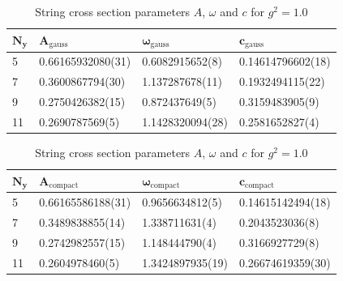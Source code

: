 \begin{table}[!hb]
\centering
\begin{tabular}{llll}
    $\mathbf{N_y}$ & $\mathbf{A_\mathrm{gauss}}$ & $\mathbf{\omega_\mathrm{gauss}}$ & $\mathbf{c_\mathrm{gauss}}$ \\ \hline
   5 & 0.66165932080(31) & 0.6082915652(8) & 0.14614796602(18) \\
   7 & 0.3600867794(30) & 1.137287678(11) & 0.1932494115(22) \\
   9 & 0.2750426382(15) & 0.872437649(5) & 0.3159483905(9) \\
   11 & 0.2690787569(5) & 1.1428320094(28) & 0.2581652827(4) \\
\end{tabular}
\begin{tabular}{llll}
    $\mathbf{N_y}$ & $\mathbf{A_\mathrm{compact}}$ & $\mathbf{\omega_\mathrm{compact}}$ & $\mathbf{c_\mathrm{compact}}$ \\ \hline
   5 & 0.66165586188(31) & 0.9656634812(5) & 0.14615142494(18) \\
   7 & 0.3489838855(14) & 1.338711631(4) & 0.2043523036(8) \\
   9 & 0.2742982557(15) & 1.148444790(4) & 0.3166927729(8) \\
   11 & 0.2604978460(5) & 1.3424897935(19) & 0.26674619359(30) \\
\end{tabular}
\caption{String cross section parameters $A$, $\omega$ and $c$ for $g^2=1.0$}
\end{table}
